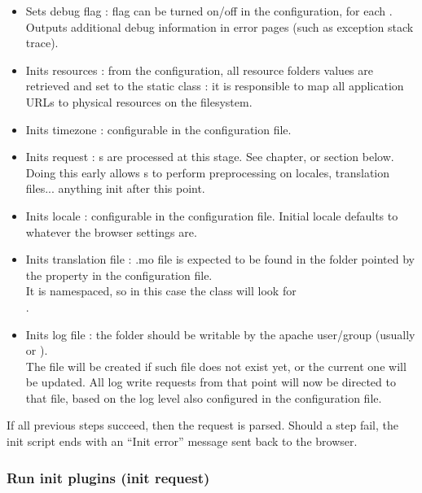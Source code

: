 \documentclass[pdftex,12pt,a4paper]{article}
\begin{document}
\begin{itemize}
    \item Sets debug flag : flag can be turned on/off in the configuration, for each . Outputs additional debug information in error pages (such as exception stack trace).
    \item Inits resources : from the configuration, all resource folders values are retrieved and set to the  static class : it is responsible to map all application URLs to physical resources on the filesystem.
    \item Inits timezone : configurable in the configuration file.
    \item Inits request : s are processed at this stage. See  chapter, or section below. Doing this early allows s to perform preprocessing on locales, translation files... \ie{} anything init after this point.
    \item Inits locale : configurable in the configuration file. Initial locale defaults to whatever the browser settings are.
    \item Inits translation file :  .mo file is expected to be found in the folder pointed by the  property in the configuration file. \\
    It is namespaced, so in this case the class will look for \\
    .
    \item Inits log file : the  folder should be writable by the apache user/group (usually  or ). \\
    The file  will be created if such file does not exist yet, or the current one will be updated. All log write requests from that point will now be directed to that file, based on the log level also configured in the configuration file.
\end{itemize}
If all previous steps succeed, then the request is parsed. Should a step fail, the init script ends with an ``Init error'' message sent back to the browser.

\subsubsection{Run init plugins (init request)}
\end{document}
